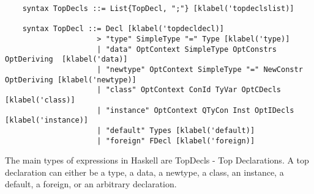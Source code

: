 \begin{lstlisting}
    syntax TopDecls ::= List{TopDecl, ";"} [klabel('topdeclslist)]

    syntax TopDecl ::= Decl [klabel('topdecldecl)]
                     > "type" SimpleType "=" Type [klabel('type)]
                     | "data" OptContext SimpleType OptConstrs OptDeriving  [klabel('data)]
                     | "newtype" OptContext SimpleType "=" NewConstr OptDeriving [klabel('newtype)]
                     | "class" OptContext ConId TyVar OptCDecls [klabel('class)]
                     | "instance" OptContext QTyCon Inst OptIDecls [klabel('instance)]
                     | "default" Types [klabel('default)]
                     | "foreign" FDecl [klabel('foreign)]
\end{lstlisting}

The main types of expressions in Haskell are TopDecls - Top Declarations. A top declaration can either be a type, a data, a newtype, a class, an instance, a default, a foreign, or an arbitrary declaration.

